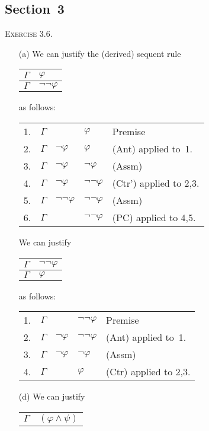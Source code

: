 \documentclass[letterpaper]{article}
\theoremstyle{remark}
\begin{document}
\subsection*{Section~3}
\noindent\textsc{Exercise 3.6.}
\begin{enumerate}
\item[(a)] We can justify the (derived) sequent rule
\begin{center}
\begin{tabular}{ll}
$\Gamma$&$\varphi$\\
\hline
$\Gamma$&$\lnot\lnot\varphi$
\end{tabular}
\end{center}
as follows:
\begin{center}
\begin{tabular}{rllll}
1.&$\Gamma$&&$\varphi$&Premise\\
2.&$\Gamma$&$\lnot\varphi$&$\varphi$&(Ant) applied to~1.\\
3.&$\Gamma$&$\lnot\varphi$&$\lnot\varphi$&(Assm)\\
4.&$\Gamma$&$\lnot\varphi$&$\lnot\lnot\varphi$&(Ctr') applied to 2,3.\\
5.&$\Gamma$&$\lnot\lnot\varphi$&$\lnot\lnot\varphi$&(Assm)\\
6.&$\Gamma$&&$\lnot\lnot\varphi$&(PC) applied to 4,5.
\end{tabular}
\end{center}
We can justify
\begin{center}
\begin{tabular}{ll}
$\Gamma$&$\lnot\lnot\varphi$\\
\hline
$\Gamma$&$\varphi$
\end{tabular}
\end{center}
as follows:
\begin{center}
\begin{tabular}{rllll}
1.&$\Gamma$&&$\lnot\lnot\varphi$&Premise\\
2.&$\Gamma$&$\lnot\varphi$&$\lnot\lnot\varphi$&(Ant) applied to~1.\\
3.&$\Gamma$&$\lnot\varphi$&$\lnot\varphi$&(Assm)\\
4.&$\Gamma$&&$\varphi$&(Ctr) applied to 2,3.
\end{tabular}
\end{center}
\item[(d)] We can justify
\begin{center}
\begin{tabular}{ll}
$\Gamma$&$(\varphi\land\psi)$\\

\end{tabular}
\end{center}
\end{enumerate}
\end{document}

